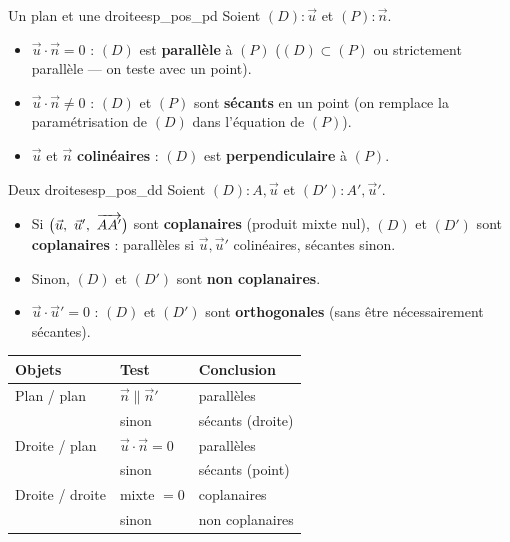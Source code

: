 \begin{propriete}{Un plan et une droite}{esp_pos_pd}
	Soient $(D) : \vec u$ et $(P) : \vec n$.
	\begin{itemize}[label=\textbullet]
		\item $\vec u \cdot \vec n = 0$ : $(D)$ est \textbf{parallèle} à $(P)$
		($(D) \subset (P)$ ou strictement parallèle — on teste avec un point).
		\item $\vec u \cdot \vec n \neq 0$ : $(D)$ et $(P)$ sont \textbf{sécants}
		en un point (on remplace la paramétrisation de $(D)$ dans l'équation de $(P)$).
		\item $\vec u$ et $\vec n$ \textbf{colinéaires} : $(D)$ est
		\textbf{perpendiculaire} à $(P)$.
	\end{itemize}
\end{propriete}

\begin{propriete}{Deux droites}{esp_pos_dd}
	Soient $(D) : A, \vec u$ et $(D') : A', \vec u'$.
	\begin{itemize}[label=\textbullet]
		\item Si $\bigl(\vec u,\ \vec u',\ \vect{AA'}\bigr)$ sont
		\textbf{coplanaires} (produit mixte nul), $(D)$ et $(D')$ sont
		\textbf{coplanaires} : parallèles si $\vec u,\vec u'$ colinéaires,
		sécantes sinon.
		\item Sinon, $(D)$ et $(D')$ sont \textbf{non coplanaires}.
		\item $\vec u \cdot \vec u' = 0$ : $(D)$ et $(D')$ sont
		\textbf{orthogonales} (sans être nécessairement sécantes).
	\end{itemize}
\end{propriete}

\begin{center}
\renewcommand{\arraystretch}{1.3}
\begin{tabular}{>{\raggedright\arraybackslash}p{3.0cm}
                >{\raggedright\arraybackslash}p{2.3cm}
                >{\raggedright\arraybackslash}p{2.6cm}}
\hline
\textbf{Objets} & \textbf{Test} & \textbf{Conclusion} \\
\hline
Plan / plan & $\vec n \parallel \vec n'$ & parallèles \\
 & sinon & sécants (droite) \\
Droite / plan & $\vec u \cdot \vec n = 0$ & parallèles \\
 & sinon & sécants (point) \\
Droite / droite & mixte $= 0$ & coplanaires \\
 & sinon & non coplanaires \\
\hline
\end{tabular}
\end{center}


